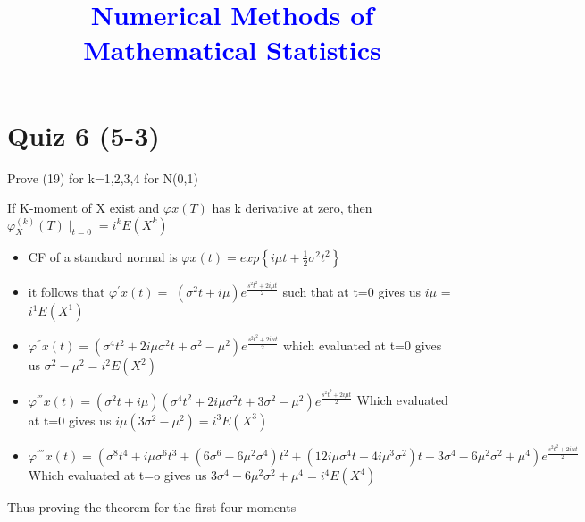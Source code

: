 \documentclass[english]{article}
\begin{document}
\title{\textcolor{blue}{\large{}Numerical Methods of Mathematical Statistics}}

\maketitle

\section{Quiz 6 (5-3)}

Prove (19) for k=1,2,3,4 for N(0,1)

If K-moment of X exist and $\varphi x(T)$ has k derivative at zero,
then $\varphi_{X}^{(k)}(T)\mid_{t=0}=i^{k}E(X^{k})$
\begin{itemize}
\item CF of a standard normal is $\varphi x(t)=exp\left\{ i\mu t+\frac{1}{2}\sigma^{2}t^{2}\right\} $ 
\item it follows that $\varphi^{'}x(t)=$ $(\sigma^{2}t+i\mu)e^{\frac{s^{2}t^{2}+2i\mu t}{2}}$
such that at t=0 gives us $i\mu$ = $i^{1}E(X^{1})$ 
\item $\varphi^{''}x(t)=(\sigma^{4}t^{2}+2i\mu\sigma^{2}t+\sigma^{2}-\mu^{2})e^{\frac{s^{2}t^{2}+2i\mu t}{2}}$
which evaluated at t=0 gives us $\sigma^{2}-\mu^{2}=i^{2}E(X^{2})$ 
\item $\varphi^{'''}x(t)=(\sigma^{2}t+i\mu)(\sigma^{4}t^{2}+2i\mu\sigma^{2}t+3\sigma^{2}-\mu^{2})e^{\frac{s^{2}t^{2}+2i\mu t}{2}}$
Which evaluated at t=0 gives us $i\mu(3\sigma^{2}-\mu^{2})=i^{3}E(X^{3})$
\item $\varphi^{''''}x(t)=(\sigma^{8}t^{4}+i\mu\sigma^{6}t^{3}+(6\sigma^{6}-6\mu^{2}\sigma^{4})t^{2}+(12i\mu\sigma^{4}t+4i\mu^{3}\sigma^{2})t+3\sigma^{4}-6\mu^{2}\sigma^{2}+\mu^{4})e^{\frac{s^{2}t^{2}+2i\mu t}{2}}$
Which evaluated at t=o gives us $3\sigma^{4}-6\mu^{2}\sigma^{2}+\mu^{4}=i^{4}E(X^{4})$
\end{itemize}
Thus proving the theorem for the first four moments 
\end{document}
